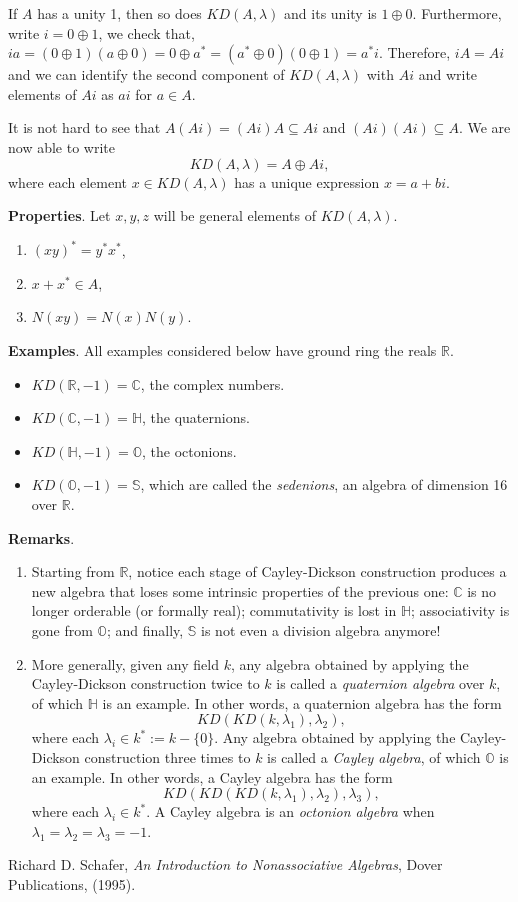 \documentclass[12pt]{article}
\begin{document}
If $A$ has a unity 1, then so does $KD(A,\lambda)$ and its unity is $1\oplus0$.  Furthermore, write $i=0\oplus1$, we check that, $ia=(0\oplus1)(a\oplus0)=0\oplus a^*=(a^*\oplus0)(0\oplus1)=a^*i$.  Therefore, $iA=Ai$ and we can identify the second component of $KD(A,\lambda)$ with $Ai$ and write elements of $Ai$ as $ai$ for $a\in A$.

It is not hard to see that $A(Ai)=(Ai)A\subseteq Ai$ and $(Ai)(Ai)\subseteq A$.  We are now able to write $$KD(A,\lambda)=A\oplus Ai,$$ where each element $x\in KD(A,\lambda)$ has a unique expression $x=a+bi$.

\textbf{Properties}.  Let $x,y,z$ will be general elements of $KD(A,\lambda)$.
\begin{enumerate}
\item $(xy)^*=y^*x^*$,
\item $x+x^*\in A$,
\item $N(xy)=N(x)N(y)$.
\end{enumerate}

\textbf{Examples}.  All examples considered below have ground ring the reals $\mathbb{R}$.
\begin{itemize}
\item $KD(\mathbb{R},-1)=\mathbb{C}$, the complex numbers.
\item $KD(\mathbb{C},-1)=\mathbb{H}$, the quaternions.
\item $KD(\mathbb{H},-1)=\mathbb{O}$, the octonions.
\item $KD(\mathbb{O},-1)=\mathbb{S}$, which are called the \emph{sedenions}, an algebra of dimension 16 over $\mathbb{R}$.
\end{itemize}

\textbf{Remarks}.  
\begin{enumerate}
\item
Starting from $\mathbb{R}$, notice each stage of Cayley-Dickson construction produces a new algebra that loses some intrinsic properties of the previous one: $\mathbb{C}$ is no longer orderable (or formally real); commutativity is lost in $\mathbb{H}$; associativity is gone from $\mathbb{O}$; and finally, $\mathbb{S}$ is not even a division algebra anymore!
\item
More generally, given any field $k$, any algebra obtained by applying the Cayley-Dickson construction twice to $k$ is called a \emph{quaternion algebra} over $k$, of which $\mathbb{H}$ is an example.  In other words, a quaternion algebra has the form $$KD(KD(k,\lambda_1),\lambda_2),$$ where each $\lambda_i \in k^*:=k-\lbrace 0 \rbrace$.  Any algebra obtained by applying the Cayley-Dickson construction three times to $k$ is called a \emph{Cayley algebra}, of which $\mathbb{O}$ is an example.  In other words, a Cayley algebra has the form $$KD(KD(KD(k,\lambda_1),\lambda_2),\lambda_3),$$ where each $\lambda_i\in k^*$.  A Cayley algebra is an \emph{octonion algebra} when $\lambda_1=\lambda_2=\lambda_3=-1$.
\end{enumerate}

\begin{thebibliography}{6}
 Richard D. Schafer, {\em An Introduction to Nonassociative Algebras}, Dover Publications, (1995).
\end{thebibliography}
\end{document}
